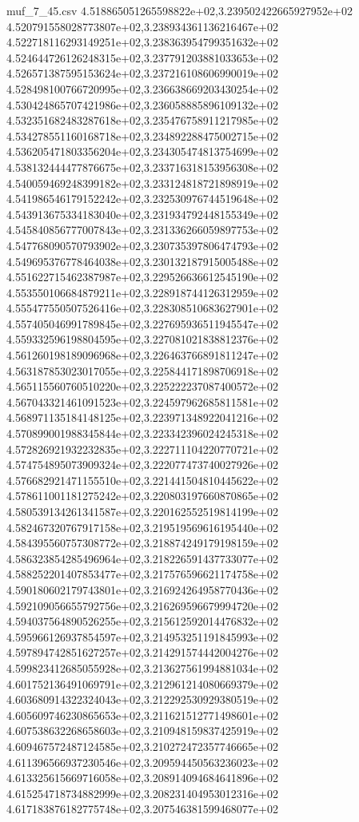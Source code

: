 \begin{filecontents*}{muf_7_45.csv}
4.518865051265598822e+02,3.239502422665927952e+02
4.520791558028773807e+02,3.238934361136216467e+02
4.522718116293149251e+02,3.238363954799351632e+02
4.524644726126248315e+02,3.237791203881033653e+02
4.526571387595153624e+02,3.237216108606990019e+02
4.528498100766720995e+02,3.236638669203430254e+02
4.530424865707421986e+02,3.236058885896109132e+02
4.532351682483287618e+02,3.235476758911217985e+02
4.534278551160168718e+02,3.234892288475002715e+02
4.536205471803356204e+02,3.234305474813754699e+02
4.538132444477876675e+02,3.233716318153956308e+02
4.540059469248399182e+02,3.233124818721898919e+02
4.541986546179152242e+02,3.232530976744519648e+02
4.543913675334183040e+02,3.231934792448155349e+02
4.545840856777007843e+02,3.231336266059897753e+02
4.547768090570793902e+02,3.230735397806474793e+02
4.549695376778464038e+02,3.230132187915005488e+02
4.551622715462387987e+02,3.229526636612545190e+02
4.553550106684879211e+02,3.228918744126312959e+02
4.555477550507526416e+02,3.228308510683627901e+02
4.557405046991789845e+02,3.227695936511945547e+02
4.559332596198804595e+02,3.227081021838812376e+02
4.561260198189096968e+02,3.226463766891811247e+02
4.563187853023017055e+02,3.225844171898706918e+02
4.565115560760510220e+02,3.225222237087400572e+02
4.567043321461091523e+02,3.224597962685811581e+02
4.568971135184148125e+02,3.223971348922041216e+02
4.570899001988345844e+02,3.223342396024245318e+02
4.572826921932232835e+02,3.222711104220770721e+02
4.574754895073909324e+02,3.222077473740027926e+02
4.576682921471155510e+02,3.221441504810445622e+02
4.578611001181275242e+02,3.220803197660870865e+02
4.580539134261341587e+02,3.220162552519814199e+02
4.582467320767917158e+02,3.219519569616195440e+02
4.584395560757308772e+02,3.218874249179198159e+02
4.586323854285496964e+02,3.218226591437733077e+02
4.588252201407853477e+02,3.217576596621174758e+02
4.590180602179743801e+02,3.216924264958770436e+02
4.592109056655792756e+02,3.216269596679994720e+02
4.594037564890526255e+02,3.215612592014476832e+02
4.595966126937854597e+02,3.214953251191845993e+02
4.597894742851627257e+02,3.214291574442004276e+02
4.599823412685055928e+02,3.213627561994881034e+02
4.601752136491069791e+02,3.212961214080669379e+02
4.603680914322324043e+02,3.212292530929380519e+02
4.605609746230865653e+02,3.211621512771498601e+02
4.607538632268658603e+02,3.210948159837425919e+02
4.609467572487124585e+02,3.210272472357746665e+02
4.611396566937230546e+02,3.209594450563236023e+02
4.613325615669716058e+02,3.208914094684641896e+02
4.615254718734882999e+02,3.208231404953012316e+02
4.617183876182775748e+02,3.207546381599468077e+02

\end{filecontents*}
